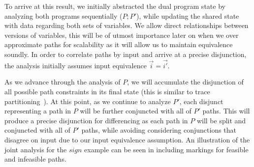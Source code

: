 To arrive at this result, we initially abstracted the dual program state by analyzing both programs sequentially ($P;P'$), while updating the shared state with data regarding both sets of variables. We allow direct relationships between versions of variables, this will be of utmost importance later on when we over approximate paths for scalability as it will allow us to maintain equivalence soundly. In order to correlate paths by input and arrive at a precise disjunction, the analysis initially assumes input equivalence $\vec{i} = \vec{i'}$.

As we advance through the analysis of $P$, we will accumulate the disjunction of all possible path constraints in its final state (this is similar to trace partitioning~\cite{MauborgneRival07}). At this point, as we continue to analyze $P'$, each disjunct representing a path in $P$ will be further conjuncted with all of $P'$ paths. This will produce a precise disjunction for differencing as each path in $P$ will be split and conjuncted with all of $P'$ paths, while avoiding considering conjunctions that disagree on input due to our input equivalence assumption. An illustration of the joint analysis for the $sign$ example can be seen in  including markings for feasible and infeasible paths.


